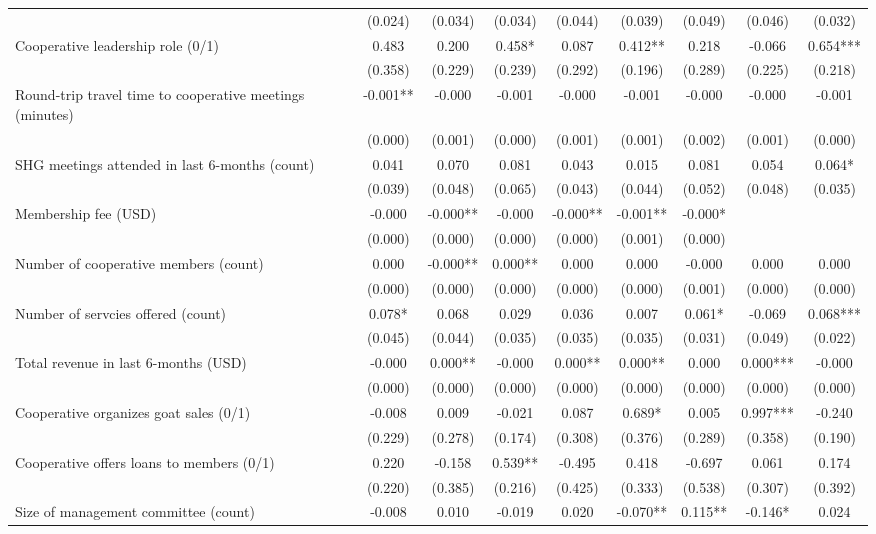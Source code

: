 \documentclass[11pt]{article}
\begin{document}
\begin{landscape}
\begin{table}[H]
{\begin{tabularx}{1.8\linewidth}{lcccccccc}
 & (0.024) & (0.034) & (0.034) & (0.044) & (0.039) & (0.049) & (0.046) & (0.032) \\
Cooperative leadership role (0/1) & 0.483 & 0.200 & 0.458* & 0.087 & 0.412** & 0.218 & -0.066 & 0.654*** \\
 & (0.358) & (0.229) & (0.239) & (0.292) & (0.196) & (0.289) & (0.225) & (0.218) \\
Round-trip travel time to cooperative meetings (minutes) & -0.001** & -0.000 & -0.001 & -0.000 & -0.001 & -0.000 & -0.000 & -0.001 \\
 & (0.000) & (0.001) & (0.000) & (0.001) & (0.001) & (0.002) & (0.001) & (0.000) \\
SHG meetings attended in last 6-months (count) & 0.041 & 0.070 & 0.081 & 0.043 & 0.015 & 0.081 & 0.054 & 0.064* \\
 & (0.039) & (0.048) & (0.065) & (0.043) & (0.044) & (0.052) & (0.048) & (0.035) \\
Membership fee (USD) & -0.000 & -0.000** & -0.000 & -0.000** & -0.001** & -0.000* &  &  \\
 & (0.000) & (0.000) & (0.000) & (0.000) & (0.001) & (0.000) &  &  \\
Number of cooperative members (count) & 0.000 & -0.000** & 0.000** & 0.000 & 0.000 & -0.000 & 0.000 & 0.000 \\
 & (0.000) & (0.000) & (0.000) & (0.000) & (0.000) & (0.001) & (0.000) & (0.000) \\
Number of servcies offered (count) & 0.078* & 0.068 & 0.029 & 0.036 & 0.007 & 0.061* & -0.069 & 0.068*** \\
 & (0.045) & (0.044) & (0.035) & (0.035) & (0.035) & (0.031) & (0.049) & (0.022) \\
Total revenue in last 6-months (USD) & -0.000 & 0.000** & -0.000 & 0.000** & 0.000** & 0.000 & 0.000*** & -0.000 \\
 & (0.000) & (0.000) & (0.000) & (0.000) & (0.000) & (0.000) & (0.000) & (0.000) \\
Cooperative organizes goat sales (0/1) & -0.008 & 0.009 & -0.021 & 0.087 & 0.689* & 0.005 & 0.997*** & -0.240 \\
 & (0.229) & (0.278) & (0.174) & (0.308) & (0.376) & (0.289) & (0.358) & (0.190) \\
Cooperative offers loans to members (0/1) & 0.220 & -0.158 & 0.539** & -0.495 & 0.418 & -0.697 & 0.061 & 0.174 \\
 & (0.220) & (0.385) & (0.216) & (0.425) & (0.333) & (0.538) & (0.307) & (0.392) \\
Size of management committee (count) & -0.008 & 0.010 & -0.019 & 0.020 & -0.070** & 0.115** & -0.146* & 0.024 \\

\end{tabularx}}
\end{table}
\end{landscape}
\end{document}
